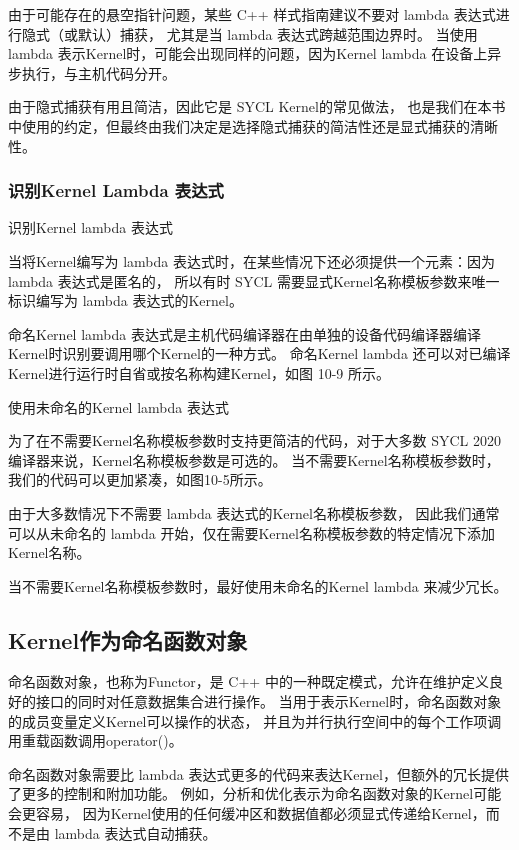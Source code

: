 \begin{remark}
由于可能存在的悬空指针问题，某些 C++ 样式指南建议不要对 lambda 表达式进行隐式（或默认）捕获，
尤其是当 lambda 表达式跨越范围边界时。
当使用 lambda 表示Kernel时，可能会出现同样的问题，因为Kernel lambda 在设备上异步执行，与主机代码分开。

由于隐式捕获有用且简洁，因此它是 SYCL Kernel的常见做法，
也是我们在本书中使用的约定，但最终由我们决定是选择隐式捕获的简洁性还是显式捕获的清晰性。
\end{remark}

\subsubsection{识别Kernel Lambda 表达式}
{\color{red} 识别Kernel lambda 表达式}

当将Kernel编写为 lambda 表达式时，在某些情况下还必须提供一个元素：因为 lambda 表达式是匿名的，
所以有时 SYCL 需要显式Kernel名称模板参数来唯一标识编写为 lambda 表达式的Kernel。

命名Kernel lambda 表达式是主机代码编译器在由单独的设备代码编译器编译Kernel时识别要调用哪个Kernel的一种方式。 
命名Kernel lambda 还可以对已编译Kernel进行运行时自省或按名称构建Kernel，如图 10-9 所示。

{\color{red} 使用未命名的Kernel lambda 表达式}

为了在不需要Kernel名称模板参数时支持更简洁的代码，对于大多数 SYCL 2020 编译器来说，Kernel名称模板参数是可选的。 
当不需要Kernel名称模板参数时，我们的代码可以更加紧凑，如图10-5所示。

由于大多数情况下不需要 lambda 表达式的Kernel名称模板参数，
因此我们通常可以从未命名的 lambda 开始，仅在需要Kernel名称模板参数的特定情况下添加Kernel名称。

\begin{remark}
	当不需要Kernel名称模板参数时，最好使用未命名的Kernel lambda 来减少冗长。
\end{remark}

\subsection{Kernel作为命名函数对象}
命名函数对象，也称为Functor，是 C++ 中的一种既定模式，允许在维护定义良好的接口的同时对任意数据集合进行操作。 
当用于表示Kernel时，命名函数对象的成员变量定义Kernel可以操作的状态，
并且为并行执行空间中的每个工作项调用重载函数调用operator()。

命名函数对象需要比 lambda 表达式更多的代码来表达Kernel，但额外的冗长提供了更多的控制和附加功能。 
例如，分析和优化表示为命名函数对象的Kernel可能会更容易，
因为Kernel使用的任何缓冲区和数据值都必须显式传递给Kernel，而不是由 lambda 表达式自动捕获。


